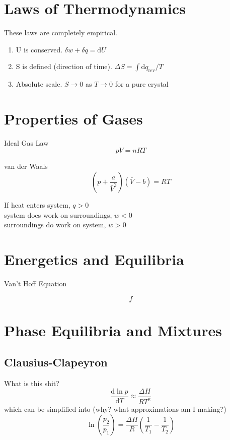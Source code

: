\section{Laws of Thermodynamics}
These laws are completely empirical.

\begin{enumerate}
    \item U is conserved. $\delta w + \delta q = \mathrm{d}U$
    \item S is defined (direction of time). $ \Delta S = \int \mathrm{d}q_{\mathrm{rev}} / T$
    \item Absolute scale. $S \rightarrow 0$ as $T \rightarrow 0$ for a pure crystal
\end{enumerate}

\section{Properties of Gases}
Ideal Gas Law $$pV = nRT$$

van der Waals $$\left(p + \frac{a}{\bar{V}^2}\right) \left(\bar{V} - b\right) = RT$$ 

If heat enters system, $q > 0$\\
system does work on surroundings, $w < 0$\\
surroundings do work on system, $w > 0$

\section{Energetics and Equilibria}

Van't Hoff Equation

\begin{equation*}
    f
\end{equation*}


\section{Phase Equilibria and Mixtures}

\subsection*{Clausius-Clapeyron}
What is this shit?
\begin{equation*}
    \frac{\mathrm{d}\ln p}{\mathrm{d}T} \approx \frac{\Delta H}{RT^2}
\end{equation*}
which can be simplified into (why? what approximations am I making?)
\begin{equation*}
    \ln\left(\frac{p_2}{p_1}\right) = \frac{\Delta H}{R}\left(\frac{1}{T_1} - \frac{1}{T_2}\right)
\end{equation*}

